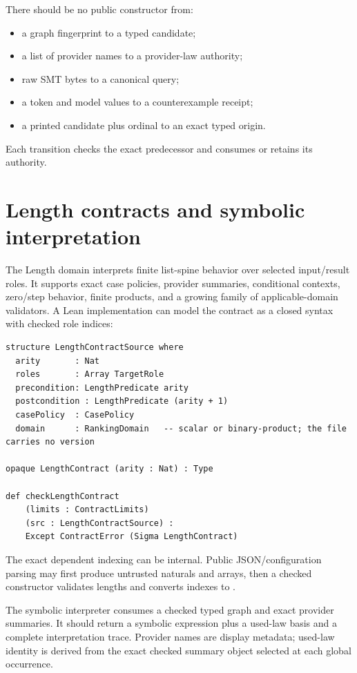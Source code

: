 \documentclass[10pt,letterpaper,oneside]{report}
\newcommand{\code}[1]{\texttt{\detokenize{#1}}}
\begin{document}
There should be no public constructor from:

\begin{itemize}
  \item a graph fingerprint to a typed candidate;
  \item a list of provider names to a provider-law authority;
  \item raw SMT bytes to a canonical query;
  \item a \code{sat} token and model values to a counterexample receipt;
  \item a printed candidate plus ordinal to an exact typed origin.
\end{itemize}

Each transition checks the exact predecessor and consumes or retains its authority.

\section{Length contracts and symbolic interpretation}

The Length domain interprets finite list-spine behavior over selected input/result roles. It supports exact case policies, provider summaries, conditional contexts, zero/step behavior, finite products, and a growing family of applicable-domain validators. A Lean implementation can model the contract as a closed syntax with checked role indices:

\begin{lstlisting}[language=Leanish]
structure LengthContractSource where
  arity       : Nat
  roles       : Array TargetRole
  precondition: LengthPredicate arity
  postcondition : LengthPredicate (arity + 1)
  casePolicy  : CasePolicy
  domain      : RankingDomain   -- scalar or binary-product; the file carries no version

opaque LengthContract (arity : Nat) : Type

def checkLengthContract
    (limits : ContractLimits)
    (src : LengthContractSource) :
    Except ContractError (Sigma LengthContract)
\end{lstlisting}

The exact dependent indexing can be internal. Public JSON/configuration parsing may first produce untrusted naturals and arrays, then a checked constructor validates lengths and converts indexes to \code{Fin arity}.

The symbolic interpreter consumes a checked typed graph and exact provider summaries. It should return a symbolic expression plus a used-law basis and a complete interpretation trace. Provider names are display metadata; used-law identity is derived from the exact checked summary object selected at each global occurrence.
\end{document}
